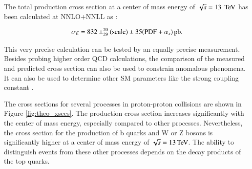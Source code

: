The total production cross section at a center of mass energy of $\sqrt{s}=13\;\,\text{Te\hspace{-.08em}V}$ has been calculated at NNLO+NNLL as \cite{Czakon:2013goa}:

\begin{equation}
\sigma_{\mathrm{t}\bar{\mathrm{t}}}   =    832 \pm^{20}_{29} {\rm (scale)} \pm 35({\rm PDF}+\alpha_s) \mbox{\ensuremath{\,\text{pb}}}. 
\end{equation}

This very precise calculation can be tested by an equally precise measurement. Besides probing higher order QCD calculations, the comparison of the measured and predicted cross section can also be used to constrain
anomalous phenomena. It can also be used to determine other SM parameters like the strong coupling constant \as.

The cross sections for several processes in proton-proton collisions are shown in Figure \ref{fig:theo_xsecs}. The \ttbar production cross section increases significantly with the center of mass energy, especially compared to other 
processes.
Nevertheless, the cross section for the production of b quarks and W or Z bosons is significantly higher at a center of mass energy of $\sqrt{s}=13\,\text{Te\hspace{-.08em}V}$. The ability to distinguish \ttbar events from these other processes depends on 
the decay products of the top quarks.


